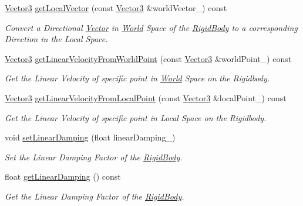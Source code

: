 \begin{DoxyCompactItemize}
\hyperlink{class_magnum_1_1_vector3}{Vector3} \hyperlink{class_magnum_1_1_physics3_1_1_vehicle_aeb5d033a513e55c94f8dbe3fb7a03670}{get\+Local\+Vector} (const \hyperlink{class_magnum_1_1_vector3}{Vector3} \&world\+Vector\+\_\+) const 
\begin{DoxyCompactList}\small\item\em Convert a Directional \hyperlink{class_magnum_1_1_vector}{Vector} in \hyperlink{class_magnum_1_1_physics3_1_1_world}{World} Space of the \hyperlink{class_magnum_1_1_physics3_1_1_rigid_body}{Rigid\+Body} to a corresponding Direction in the Local Space. \end{DoxyCompactList}\item 
\hyperlink{class_magnum_1_1_vector3}{Vector3} \hyperlink{class_magnum_1_1_physics3_1_1_vehicle_a3420f395123dc26b223b8b4420aa15ea}{get\+Linear\+Velocity\+From\+World\+Point} (const \hyperlink{class_magnum_1_1_vector3}{Vector3} \&world\+Point\+\_\+) const 
\begin{DoxyCompactList}\small\item\em Get the Linear Velocity of specific point in \hyperlink{class_magnum_1_1_physics3_1_1_world}{World} Space on the Rigidbody. \end{DoxyCompactList}\item 
\hyperlink{class_magnum_1_1_vector3}{Vector3} \hyperlink{class_magnum_1_1_physics3_1_1_vehicle_a9fc5f45544f10104d92956b180061a2e}{get\+Linear\+Velocity\+From\+Local\+Point} (const \hyperlink{class_magnum_1_1_vector3}{Vector3} \&local\+Point\+\_\+) const 
\begin{DoxyCompactList}\small\item\em Get the Linear Velocity of specific point in Local Space on the Rigidbody. \end{DoxyCompactList}\item 
void \hyperlink{class_magnum_1_1_physics3_1_1_vehicle_a6c8184706ec0b84a018a528dce980a63}{set\+Linear\+Damping} (float linear\+Damping\+\_\+)
\begin{DoxyCompactList}\small\item\em Set the Linear Damping Factor of the \hyperlink{class_magnum_1_1_physics3_1_1_rigid_body}{Rigid\+Body}. \end{DoxyCompactList}\item 
float \hyperlink{class_magnum_1_1_physics3_1_1_vehicle_a86fda41452842e012b716e20547b6d8b}{get\+Linear\+Damping} () const 
\begin{DoxyCompactList}\small\item\em Get the Linear Damping Factor of the \hyperlink{class_magnum_1_1_physics3_1_1_rigid_body}{Rigid\+Body}. \end{DoxyCompactList}\item 

\end{DoxyCompactItemize}
